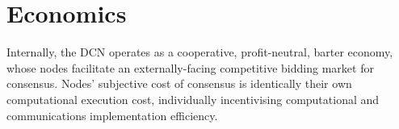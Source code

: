 \documentclass[twocolumn, aps, amsmath, amssymb, nofootinbib, superscriptaddress, longbibliography, floatfix, eqsecnum, rmp]{revtex4-2}
\begin{document}
%

%
%
%

\section{Economics} \label{sec:economics}

Internally, the DCN operates as a cooperative, profit-neutral, barter economy, whose nodes facilitate an externally-facing competitive bidding market for consensus. Nodes' subjective cost of consensus is identically their own computational execution cost, individually incentivising computational and communications implementation efficiency.
\end{document}
